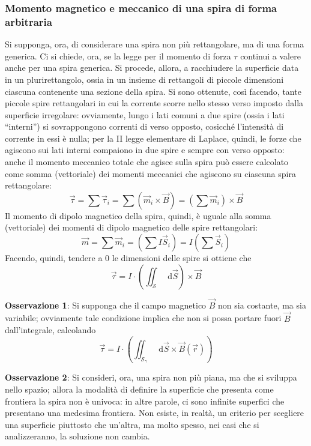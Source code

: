 \documentclass[a4paper]{extarticle}
\newcommand{\quotes}[1]{``#1''}
\newcommand\dif{\mathop{}\!\mathrm{d}}
\begin{document}
\vspace{1em}
\noindent
\subsubsection{Momento magnetico e meccanico di una spira di forma arbitraria}
Si supponga, ora, di considerare una spira non più rettangolare, ma di una forma generica. Ci si chiede, ora, se la legge per il momento di forza $\tau$ continui a valere anche per una spira generica. Si procede, allora, a racchiudere la superficie data in un plurirettangolo, ossia in un insieme di rettangoli di piccole dimensioni ciascuna contenente una sezione della spira. Si sono ottenute, così facendo, tante piccole spire rettangolari in cui la corrente scorre nello stesso verso imposto dalla superficie irregolare: ovviamente, lungo i lati comuni a due spire (ossia i lati \quotes{interni}) si sovrappongono correnti di verso opposto, cosicché l'intensità di corrente in essi è nulla; per la II legge elementare di Laplace, quindi, le forze che agiscono sui lati interni compaiono in due spire e sempre con verso opposto: anche il momento meccanico totale che agisce sulla spira può essere calcolato come somma (vettoriale) dei momenti meccanici che agiscono su ciascuna spira rettangolare:
\[\vec \tau = \sum \vec{\tau}_i = \sum \left(\vec{m}_i \times \vec B\right) = \left(\sum \vec{m}_i\right) \times \vec B\]
Il momento di dipolo magnetico della spira, quindi, è uguale alla somma (vettoriale) dei momenti di dipolo magnetico delle spire rettangolari:
\[\vec m = \sum \vec{m}_i = \left(\sum I \vec{S}_i\right) = I\left(\sum \vec{S}_i\right)\]
Facendo, quindi, tendere a $0$ le dimensioni delle spire si ottiene che
\[\vec \tau = I \cdot \left(\iint_\mathcal{S} \dif \vec S \right) \times \vec B\]

\vspace{2em}
\noindent
\textbf{Osservazione 1}: Si supponga che il campo magnetico $\vec B$ non sia costante, ma sia variabile; ovviamente tale condizione implica che non si possa portare fuori $\vec B$ dall'integrale, calcolando
\[\vec \tau = I \cdot \left(\iint_{\mathcal{S}_\gamma} \dif \vec S \times \vec B(\vec r)\right)\]

\vspace{2em}
\noindent
\textbf{Osservazione 2}: Si consideri, ora, una spira non più piana, ma che si sviluppa nello spazio; allora la modalità di definire la superficie che presenta come frontiera la spira non è univoca: in altre parole, ci sono infinite superfici che presentano una medesima frontiera. Non esiste, in realtà, un criterio per scegliere una superficie piuttosto che un'altra, ma molto spesso, nei casi che si analizzeranno, la soluzione non cambia.
\end{document}
